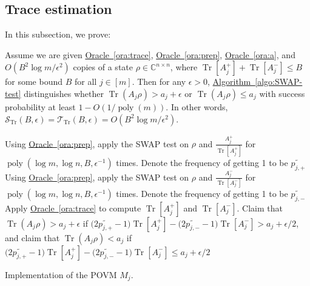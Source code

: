 \documentclass[a4paper,UKenglish,cleveref, autoref]{lipics-v2019}
\theoremstyle{remark}
\numberwithin{equation}{section}
\numberwithin{oracle}{section}
\numberwithin{remark}{section}
\newcommand{\ora}[1]{\hyperref[ora:#1]{Oracle~\ref*{ora:#1}}}
\newcommand{\algo}[1]{\hyperref[algo:#1]{Algorithm~\ref*{algo:#1}}}
\newcommand{\range}[1]{[#1]}
\newcommand{\C}{\ensuremath{\mathbb{C}}}
\DeclareMathOperator{\poly}{poly}
\DeclareMathOperator{\tr}{Tr}
\DeclareMathOperator{\Tr}{Tr}
\begin{document}
\subsection{Trace estimation}
In this subsection, we prove:
\begin{lemma}\label{lem:oracle-implementation-SWAP}
Assume we are given \ora{trace}, \ora{prep}, \ora{a}, and $O(B^{2}\log m/\epsilon^{2})$ copies of a state $\rho\in\C^{n\times n}$, where $\Tr[A_{j}^{+}]+\Tr[A_{j}^{-}]\leq B$ for some bound $B$ for all $j\in\range{m}$. Then for any $\epsilon>0$, \algo{SWAP-test} distinguishes whether $\tr(A_{j} \rho)>a_{j}+\epsilon$ or $\tr(A_{j} \rho)\leq a_{j}$ with success probability at least $1-O(1/\poly(m))$. In other words, $\mathcal{S}_{\tr}(B,\epsilon)=\mathcal{T}_{\tr}(B,\epsilon)=O(B^{2}\log m/\epsilon^{2})$.
\end{lemma}

\begin{algorithm}[htbp]
    Using \ora{prep}, apply the \textsf{SWAP} test on $\rho$ and $\frac{A_{j}^{+}}{\Tr[A_{j}^{+}]}$ for $\poly(\log m,\log n,B,\epsilon^{-1})$ times. Denote the frequency of getting 1 to be $\widetilde{p_{j,+}}$\; \label{line:search-variable-swap-1}
    Using \ora{prep}, apply the \textsf{SWAP} test on $\rho$ and $\frac{A_{j}^{-}}{\Tr[A_{j}^{-}]}$ for $\poly(\log m,\log n,B,\epsilon^{-1})$ times. Denote the frequency of getting 1 to be $\widetilde{p_{j,-}}$\; \label{line:search-variable-swap-2}
    Apply \ora{trace} to compute $\Tr[A_{j}^{+}]$ and $\Tr[A_{j}^{-}]$. Claim that $\tr(A_{j} \rho)>a_{j}+\epsilon$ if $\big(2\widetilde{p_{j,+}}-1\big)\Tr[A_{j}^{+}]-\big(2\widetilde{p_{j,-}}-1\big)\Tr[A_{j}^{-}]>a_{j}+\epsilon/2$, and claim that $\tr(A_{j} \rho)<a_{j}$ if $\big(2\widetilde{p_{j,+}}-1\big)\Tr[A_{j}^{+}]-\big(2\widetilde{p_{j,-}}-1\big)\Tr[A_{j}^{-}]\leq a_{j}+\epsilon/2$\; \label{line:search-variable-cost-2}
\caption{Implementation of the POVM $M_{j}$.}
\label{algo:SWAP-test}
\end{algorithm}
\end{document}

